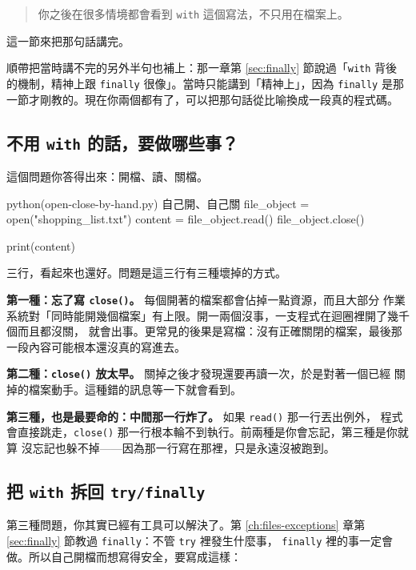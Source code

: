\begin{quote}
你之後在很多情境都會看到 \texttt{with} 這個寫法，不只用在檔案上。
\end{quote}

這一節來把那句話講完。

順帶把當時講不完的另外半句也補上：那一章第 \ref{sec:finally} 節說過「\texttt{with} 背後
的機制，精神上跟 \texttt{finally} 很像」。當時只能講到「精神上」，因為 \texttt{finally}
是那一節才剛教的。現在你兩個都有了，可以把那句話從比喻換成一段真的程式碼。

\subsection*{不用 \texttt{with} 的話，要做哪些事？}

這個問題你答得出來：開檔、讀、關檔。

\begin{example}{python}{(open-close-by-hand.py) 自己開、自己關}
file_object = open("shopping_list.txt")
content = file_object.read()
file_object.close()

print(content)
\end{example}


三行，看起來也還好。問題是這三行有三種壞掉的方式。

\textbf{第一種：忘了寫 \texttt{close()}。} 每個開著的檔案都會佔掉一點資源，而且大部分
作業系統對「同時能開幾個檔案」有上限。開一兩個沒事，一支程式在迴圈裡開了幾千個而且都沒關，
就會出事。更常見的後果是寫檔：沒有正確關閉的檔案，最後那一段內容可能根本還沒真的寫進去。

\textbf{第二種：\texttt{close()} 放太早。} 關掉之後才發現還要再讀一次，於是對著一個已經
關掉的檔案動手。這種錯的訊息等一下就會看到。

\textbf{第三種，也是最要命的：中間那一行炸了。} 如果 \texttt{read()} 那一行丟出例外，
程式會直接跳走，\texttt{close()} 那一行根本輪不到執行。前兩種是你會忘記，第三種是你就算
沒忘記也躲不掉——因為那一行寫在那裡，只是永遠沒被跑到。

\subsection*{把 \texttt{with} 拆回 \texttt{try/finally}}

第三種問題，你其實已經有工具可以解決了。第 \ref{ch:files-exceptions} 章第
\ref{sec:finally} 節教過 \texttt{finally}：不管 \texttt{try} 裡發生什麼事，
\texttt{finally} 裡的事一定會做。所以自己開檔而想寫得安全，要寫成這樣：

